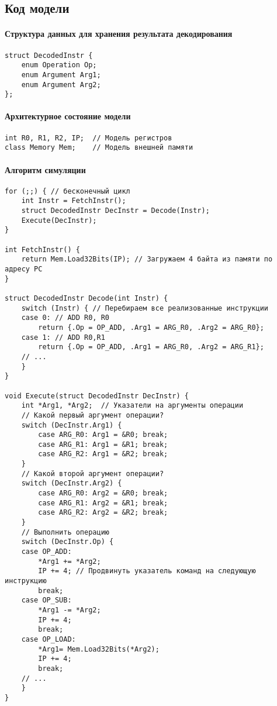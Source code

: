 \subsection{Код модели}

\paragraph{Структура данных для хранения результата декодирования} 
\begin{lstlisting}
struct DecodedInstr {
    enum Operation Op;
    enum Argument Arg1;
    enum Argument Arg2;
};
\end{lstlisting}

\paragraph{Архитектурное состояние модели}
\begin{lstlisting}
int R0, R1, R2, IP;  // Модель регистров
class Memory Mem;    // Модель внешней памяти
\end{lstlisting}

\paragraph{Алгоритм симуляции}
\begin{lstlisting}
for (;;) { // бесконечный цикл
    int Instr = FetchInstr();
    struct DecodedInstr DecInstr = Decode(Instr);
    Execute(DecInstr);
}

int FetchInstr() {
    return Mem.Load32Bits(IP); // Загружаем 4 байта из памяти по адресу PC
}

struct DecodedInstr Decode(int Instr) {
    switch (Instr) { // Перебираем все реализованные инструкции
    case 0: // ADD R0, R0
        return {.Op = OP_ADD, .Arg1 = ARG_R0, .Arg2 = ARG_R0};
    case 1: // ADD R0,R1
        return {.Op = OP_ADD, .Arg1 = ARG_R0, .Arg2 = ARG_R1};
    // ...
    }
}

void Execute(struct DecodedInstr DecInstr) {
    int *Arg1, *Arg2;  // Указатели на аргументы операции
    // Какой первый аргумент операции?
    switch (DecInstr.Arg1) {
        case ARG_R0: Arg1 = &R0; break;
        case ARG_R1: Arg1 = &R1; break;
        case ARG_R2: Arg1 = &R2; break;
    }
    // Какой второй аргумент операции?
    switch (DecInstr.Arg2) {
        case ARG_R0: Arg2 = &R0; break;
        case ARG_R1: Arg2 = &R1; break;
        case ARG_R2: Arg2 = &R2; break;
    }
    // Выполнить операцию
    switch (DecInstr.Op) {
    case OP_ADD:
        *Arg1 += *Arg2;
        IP += 4; // Продвинуть указатель команд на следующую инструкцию
        break;
    case OP_SUB:
        *Arg1 -= *Arg2;
        IP += 4; 
        break;
    case OP_LOAD:
        *Arg1= Mem.Load32Bits(*Arg2);
        IP += 4; 
        break;
    // ...
    }
}
\end{lstlisting}


